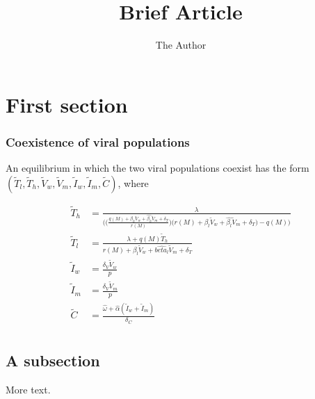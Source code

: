 \documentclass[11pt]{article} %
\title{Brief Article}
\author{The Author}
\begin{document}
\maketitle

\section{First section}

\subsubsection{Coexistence of viral populations}

An equilibrium in which the two viral populations coexist has the form $(\tilde{T}_l,\tilde{T}_h,\tilde{V}_w,\tilde{V}_m,\tilde{I}_w,\tilde{I}_m,\tilde{C})$, where

\begin{align*}
\tilde{T}_h & = \frac{\lambda}{\Bigg( \Big( \frac{q(M) + \beta_h \tilde{V}_w + \hat{\beta_h} \tilde{V}_m + \delta_T}{r(M)}  \Big)  \Big(r(M) + \beta_l \tilde{V}_w + \hat{\beta_l} \tilde{V}_m + \delta_T \Big) - q(M) \Bigg)} \\
\tilde{T}_l & = \frac{\lambda + q(M) \tilde{T}_h}{r(M) + \beta_l \tilde{V}_w + \hat{beta_l} \tilde{V}_m +\delta_T}\\
\tilde{I}_w & = \frac{\delta_V \tilde{V}_w}{p} \\
\tilde{I}_m & = \frac{\delta_V \tilde{V}_m}{p} \\
\tilde{C} & = \frac{ \hat{\omega} + \hat{\alpha} (\tilde{I}_w + \tilde{I}_m)}{\delta_C} \\
\end{align*}

\subsection{A subsection}


More text.
\end{document}
